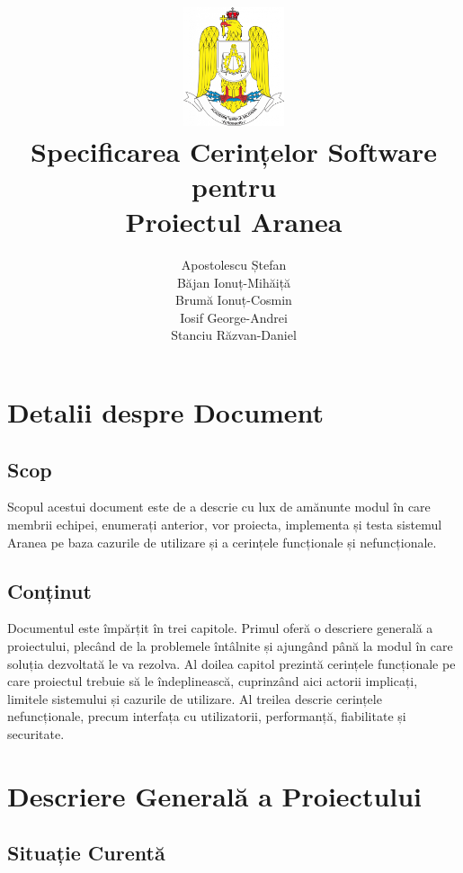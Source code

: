 \documentclass[12pt]{article}
\title{
    \includegraphics[width=3cm, height=3.5cm]{Academy Logo.png} \\
    \vspace{5mm}
    {Specificarea Cerințelor Software pentru\\
    Proiectul \textbf{Aranea}}
    \vspace{10mm}
}
\author{
    Apostolescu Ștefan \\
    Băjan Ionuț-Mihăiță \\
    Brumă Ionuț-Cosmin \\
    Iosif George-Andrei \\
    Stanciu Răzvan-Daniel \\
    \vspace{10mm}
}
\begin{document}
\null
\nointerlineskip 
\vfill
\let\snewpage \newpage
\let\newpage \relax
\maketitle
\let \newpage \snewpage
\vfill 
\break

\newpage

\tableofcontents

\newpage

\listoffigures

\listoftables

\newpage

\section{Detalii despre Document}

\subsection{Scop}
Scopul acestui document este de a descrie cu lux de amănunte modul în care membrii echipei, enumerați anterior, vor proiecta, implementa și testa sistemul Aranea pe baza cazurile de utilizare și a cerințele funcționale și nefuncționale.

\subsection{Conținut}
Documentul este împărțit în trei capitole. Primul oferă o descriere generală a proiectului, plecând de la problemele întâlnite și ajungând până la modul în care soluția dezvoltată le va rezolva. Al doilea capitol prezintă cerințele funcționale pe care proiectul trebuie să le îndeplinească, cuprinzând aici actorii implicați, limitele sistemului și cazurile de utilizare. Al treilea descrie cerințele nefuncționale, precum interfața cu utilizatorii, performanță, fiabilitate și securitate.

\newpage

\section{Descriere Generală a Proiectului}

\subsection{Situație Curentă}
\end{document}
